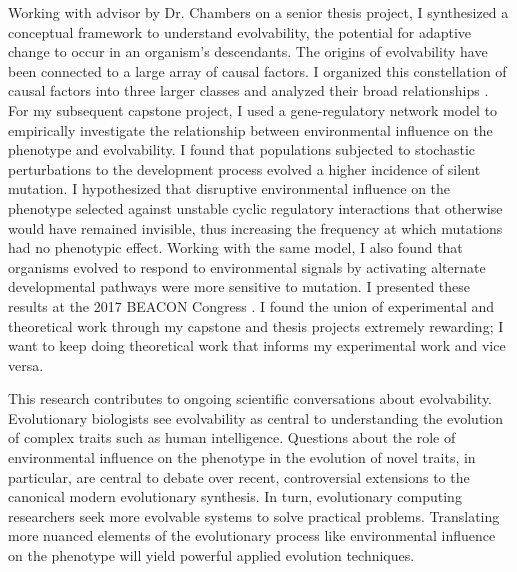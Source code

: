 Working with advisor by Dr. Chambers on a senior thesis project, I synthesized a conceptual framework to understand evolvability, the potential for adaptive change to occur in an organism's descendants.
The origins of evolvability have been connected to a large array of causal factors.
I organized this constellation of causal factors into three larger classes and analyzed their broad relationships \cite{thesis}.
For my subsequent capstone project, I used a gene-regulatory network model to empirically investigate the relationship between environmental influence on the phenotype and evolvability.
I found that populations subjected to stochastic perturbations to the development process evolved a higher incidence of silent mutation.
I hypothesized that disruptive environmental influence on the phenotype selected against unstable cyclic regulatory interactions that otherwise would have remained invisible, thus increasing the frequency at which mutations had no phenotypic effect.
Working with the same model, I also found that organisms evolved to respond to environmental signals by activating alternate developmental pathways were more sensitive to mutation.
I presented these results at the 2017 BEACON Congress \cite{beacon}.
I found the union of experimental and theoretical work through my capstone and thesis projects extremely rewarding;
I want to keep doing theoretical work that informs my experimental work and vice versa.

This research contributes to ongoing scientific conversations about evolvability.
Evolutionary biologists see evolvability as central to understanding the evolution of complex traits such as human intelligence.
Questions about the role of environmental influence on the phenotype in the evolution of novel traits, in particular, are central to debate over recent, controversial extensions to the canonical modern evolutionary synthesis.
In turn, evolutionary computing researchers seek more evolvable systems to solve practical problems.
Translating more nuanced elements of the evolutionary process like environmental influence on the phenotype will yield powerful applied evolution techniques.
